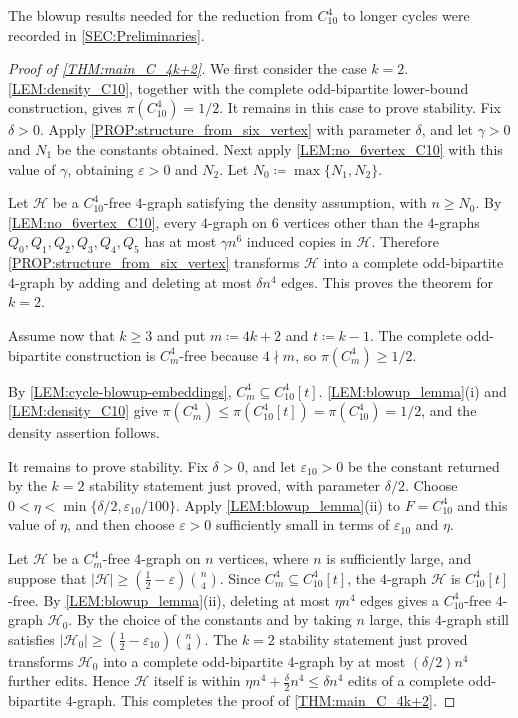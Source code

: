 \documentclass[10pt,a4paper]{article}
\theoremstyle{plain}
\theoremstyle{definition}
\begin{document}
The blowup results needed for the reduction from $C_{10}^4$ to longer cycles were recorded in \cref{SEC:Preliminaries}.

\begin{proof}[Proof of \cref{THM:main_C_4k+2}]
We first consider the case $k=2$.  \cref{LEM:density_C10}, together with the complete odd-bipartite lower-bound construction, gives $\pi(C_{10}^4)=1/2$.  It remains in this case to prove stability.  Fix $\delta>0$.  Apply \cref{PROP:structure_from_six_vertex} with parameter $\delta$, and let $\gamma>0$ and $N_1$ be the constants obtained.  Next apply \cref{LEM:no_6vertex_C10} with this value of $\gamma$, obtaining $\varepsilon>0$ and $N_2$.  Let $N_0\coloneqq\max\{N_1,N_2\}$.

Let $\mathcal H$ be a $C_{10}^4$-free $4$-graph satisfying the density assumption, with $n\ge N_0$.  By \cref{LEM:no_6vertex_C10}, every $4$-graph on $6$ vertices other than the $4$-graphs $Q_0,Q_1,Q_2,Q_3,Q_4,Q_5$ has at most $\gamma n^6$ induced copies in $\mathcal H$.  Therefore \cref{PROP:structure_from_six_vertex} transforms $\mathcal H$ into a complete odd-bipartite $4$-graph by adding and deleting at most $\delta n^4$ edges.  This proves the theorem for $k=2$.

Assume now that $k\ge3$ and put $m\coloneqq4k+2$ and $t\coloneqq k-1$.  The complete odd-bipartite construction is $C_m^4$-free because $4\nmid m$, so $\pi(C_m^4)\ge1/2$.

By \cref{LEM:cycle-blowup-embeddings}, $C_m^4\subseteq C_{10}^4[t]$.  \cref{LEM:blowup_lemma}\textup{(i)} and \cref{LEM:density_C10} give $\pi(C_m^4)\le \pi(C_{10}^4[t])=\pi(C_{10}^4)=1/2$, and the density assertion follows.

It remains to prove stability.  Fix $\delta>0$, and let $\varepsilon_{10}>0$ be the constant returned by the $k=2$ stability statement just proved, with parameter $\delta/2$.  Choose $0<\eta<\min\{\delta/2,\varepsilon_{10}/100\}$.
Apply \cref{LEM:blowup_lemma}\textup{(ii)} to $F=C_{10}^4$ and this value of $\eta$, and then choose $\varepsilon>0$ sufficiently small in terms of $\varepsilon_{10}$ and $\eta$.

Let $\mathcal H$ be a $C_m^4$-free $4$-graph on $n$ vertices, where $n$ is sufficiently large, and suppose that $|\mathcal H|\ge \left(\frac12-\varepsilon\right)\binom n4$.
Since $C_m^4\subseteq C_{10}^4[t]$, the $4$-graph $\mathcal H$ is $C_{10}^4[t]$-free.  By \cref{LEM:blowup_lemma}\textup{(ii)}, deleting at most $\eta n^4$ edges gives a $C_{10}^4$-free $4$-graph $\mathcal H_0$.  By the choice of the constants and by taking $n$ large, this $4$-graph still satisfies $|\mathcal H_0|\ge \left(\frac12-\varepsilon_{10}\right)\binom n4$. 
The $k=2$ stability statement just proved transforms $\mathcal H_0$ into a complete odd-bipartite $4$-graph by at most $(\delta/2)n^4$ further edits.  Hence $\mathcal H$ itself is within $\eta n^4+\frac{\delta}{2}n^4\le \delta n^4$ edits of a complete odd-bipartite $4$-graph.  This completes the proof of \cref{THM:main_C_4k+2}.
\end{proof}
\end{document}
